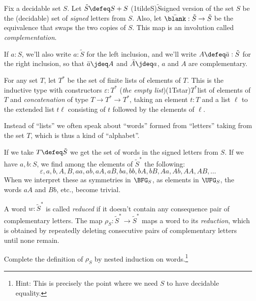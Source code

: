 \begin{definition}
  Fix a decidable set $S$. Let $\tilde S \defeq S + S$%
  \glossary(1tildeS){$\tilde S$}{signed version of the set $S$}
  be the (decidable) set of \emph{signed} letters from $S$.
  Also, let $\bar{\blank} : \tilde S \to \tilde S$
  be the equivalence that swaps the two copies of $S$.
  This map is an involution called \emph{complementation}.
\end{definition}

If $a:S$, we'll also write $a:\tilde S$ for the left inclusion,
and we'll write $A\defeq\bar a:\tilde S$ for the right inclusion,
so that $\bar a \jdeq A$ and $\bar A \jdeq a$, \ie $a$ and $A$ are complementary.

\begin{definition}
  For any set $T$, let $T^*$ be the set of finite lists of elements of $T$.
  This is the inductive type with constructors $\varepsilon : T^*$
  (\emph{the empty list})\glossary(1Tstar){$T^*$}{list of elements of $T$}%
  and \emph{concatenation} of type $T \to T^* \to T^*$,
  taking an element $t:T$ and a list $\ell$ to the extended list $t\ell$
  consisting of $t$ followed by the elements of $\ell$.
\end{definition}
Instead of ``lists'' we often speak about ``words'' formed from ``letters''
taking from the set $T$, which is thus a kind of ``alphabet''.

If we take $T \defeq \tilde S$ we get the set of words in the signed letters from $S$. If we have $a,b:S$, we find among the elements of $\tilde S^*$ the following:
\[
  \varepsilon,a,b,A,B,aa,ab,aA,aB,ba,bb,bA,bB,Aa,Ab,AA,AB,\ldots
\]
When we interpret these as symmetries in $\BFG_S$, \ie as elements in $\UFG_S$,
the words $aA$ and $Bb$, etc., become trivial.
\begin{definition}
  A word $w : \tilde S^*$ is called \emph{reduced}
  if it doesn't contain any consequence pair of complementary letters.
  The map $\rho_S : \tilde S^* \to \tilde S^*$ maps a word to its \emph{reduction},
  which is obtained by repeatedly deleting consecutive pairs of complementary
  letters until none remain.
\end{definition}

\begin{xca}
  Complete the definition of $\rho_S$ by nested induction on words.\footnote{%
    Hint: This is precisely the point where we need $S$ to have decidable equality.}
\end{xca}

